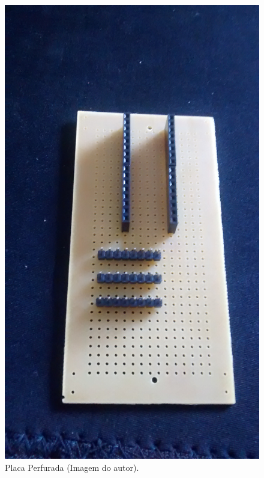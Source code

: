 		\begin{figure}[h!]
			\centering
			\includegraphics[keepaspectratio=true,scale=0.075]{figuras/placa_furada.jpg}
			\caption{Placa Perfurada (Imagem do autor).}
			
			\label{placa}	
		\end{figure}
	
